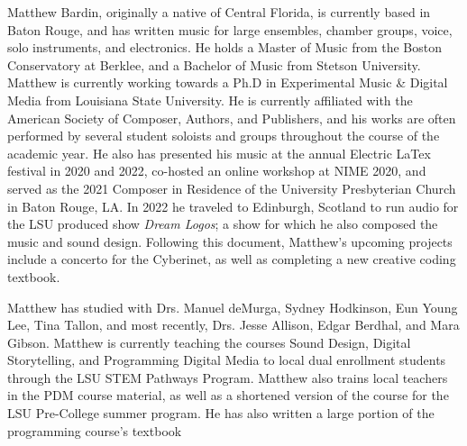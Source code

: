 Matthew Bardin, originally a native of Central Florida, is currently based in Baton Rouge, and has written music for large ensembles, chamber groups, voice, solo instruments, and electronics. He holds a Master of Music from the Boston Conservatory at Berklee, and a  Bachelor of Music from Stetson University. Matthew is currently working towards a Ph.D in Experimental Music \& Digital Media from Louisiana State University. He is currently affiliated with the American Society of Composer, Authors, and Publishers, and his works are often performed by several student soloists and groups throughout the course of the academic year. He also has presented his music at the annual Electric LaTex festival in 2020 and 2022, co-hosted an online workshop at NIME 2020, and served as the 2021 Composer in Residence of the University Presbyterian Church in Baton Rouge, LA. In 2022 he traveled to Edinburgh, Scotland to run audio for the LSU produced show \textit{Dream Logos}; a show for which he also composed the music and sound design. Following this document, Matthew's upcoming projects include a concerto for the Cyberinet, as well as completing a new creative coding textbook.

Matthew has studied with Drs. Manuel deMurga, Sydney Hodkinson, Eun Young Lee, Tina Tallon, and most recently, Drs. Jesse Allison, Edgar Berdhal, and Mara Gibson. Matthew is currently teaching the courses Sound Design, Digital Storytelling, and Programming Digital Media to local dual enrollment students through the LSU STEM Pathways Program. Matthew also trains local teachers in the PDM course material, as well as a shortened version of the course for the LSU Pre-College summer program. He has also written a large portion of the programming course's textbook


